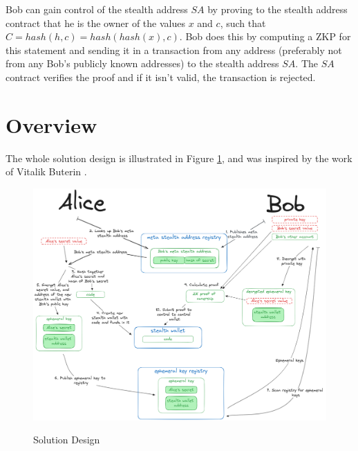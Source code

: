 Bob can gain control of the stealth address $SA$ by proving to the stealth
address contract that he is the owner of the values $x$ and $c$, such that\\
$C = hash(h, c) = hash(hash(x), c)$. Bob does this by computing a ZKP for 
this statement and sending it in a transaction from any address (preferably
not from any Bob's publicly known addresses) to the stealth address $SA$. The
$SA$ contract verifies the proof and if it isn't valid, the transaction is
rejected.

\section{Overview}

The whole solution design is illustrated in Figure \ref{fig:solution},
and was inspired by the work of Vitalik Buterin \cite{ButerinIncompleteGuide}.

\begin{figure}[h]
    \centering
    \includegraphics[width=\textwidth]{assets/images/high-level-flow.png}
    \caption{Solution Design}
	\cite{ButerinIncompleteGuide}
    \label{fig:solution}
    \vspace{0.5cm}
\end{figure}

